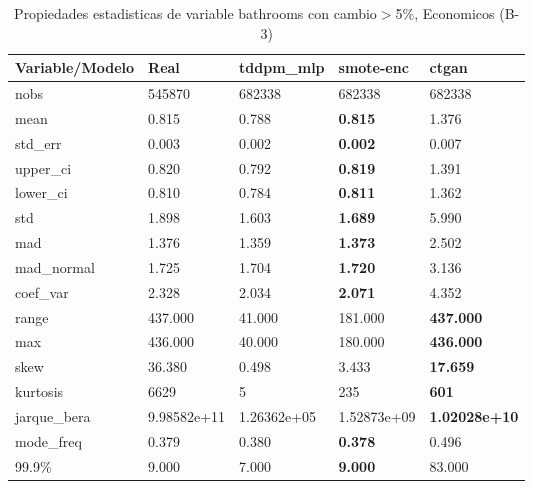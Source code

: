 \begin{table}[H]
\centering
\fontsize{8}{14}\selectfont
\caption{Propiedades estadisticas de variable bathrooms con cambio\ensuremath{>}5\%, Economicos (B-3)}
\label{table-stats-economicos-b-3-bathrooms-short}
\begin{tabular}{|l|m{10em}|m{10em}|m{10em}|m{10em}|}
\hline
 \rowcolor[gray]{0.8}
Variable/Modelo & Real & tddpm\_mlp & smote-enc & ctgan \\
\hline nobs & 545870 & 682338 & 682338 & 682338 \\
\hline mean & 0.815 & 0.788 & \bfseries 0.815 & \cellcolor[rgb]{0.9, 0.54, 0.52} 1.376 \\
\hline std\_err & 0.003 & 0.002 & \bfseries 0.002 & \cellcolor[rgb]{0.9, 0.54, 0.52} 0.007 \\
\hline upper\_ci & 0.820 & 0.792 & \bfseries 0.819 & \cellcolor[rgb]{0.9, 0.54, 0.52} 1.391 \\
\hline lower\_ci & 0.810 & 0.784 & \bfseries 0.811 & \cellcolor[rgb]{0.9, 0.54, 0.52} 1.362 \\
\hline std & 1.898 & 1.603 & \bfseries 1.689 & \cellcolor[rgb]{0.9, 0.54, 0.52} 5.990 \\
\hline mad & 1.376 & 1.359 & \bfseries 1.373 & \cellcolor[rgb]{0.9, 0.54, 0.52} 2.502 \\
\hline mad\_normal & 1.725 & 1.704 & \bfseries 1.720 & \cellcolor[rgb]{0.9, 0.54, 0.52} 3.136 \\
\hline coef\_var & 2.328 & 2.034 & \bfseries 2.071 & \cellcolor[rgb]{0.9, 0.54, 0.52} 4.352 \\
\hline range & 437.000 & \cellcolor[rgb]{0.9, 0.54, 0.52} 41.000 & 181.000 & \bfseries 437.000 \\
\hline max & 436.000 & \cellcolor[rgb]{0.9, 0.54, 0.52} 40.000 & 180.000 & \bfseries 436.000 \\
\hline skew & 36.380 & \cellcolor[rgb]{0.9, 0.54, 0.52} 0.498 & 3.433 & \bfseries 17.659 \\
\hline kurtosis & 6629 & \cellcolor[rgb]{0.9, 0.54, 0.52} 5 & 235 & \bfseries 601 \\
\hline jarque\_bera & 9.98582e+11 & \cellcolor[rgb]{0.9, 0.54, 0.52} 1.26362e+05 & 1.52873e+09 & \bfseries 1.02028e+10 \\
\hline mode\_freq & 0.379 & 0.380 & \bfseries 0.378 & \cellcolor[rgb]{0.9, 0.54, 0.52} 0.496 \\
\hline 99.9\% & 9.000 & 7.000 & \bfseries 9.000 & \cellcolor[rgb]{0.9, 0.54, 0.52} 83.000 \\
\hline
\end{tabular}
\end{table}
